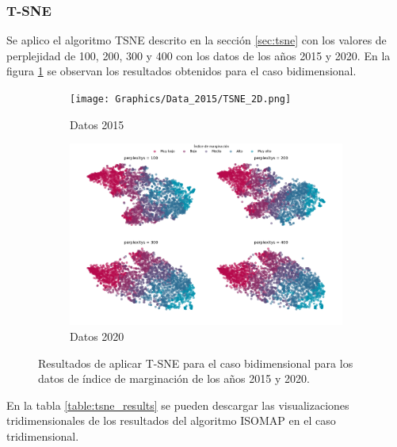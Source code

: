 \subsubsection{T-SNE}

Se aplico el algoritmo TSNE descrito en la sección \ref{sec:tsne} con los valores de perplejidad de 100, 200, 300 y 400 con los datos de los años 2015 y 2020. En la figura \ref{fig:tsne_2d} se observan los resultados obtenidos para el caso bidimensional.

\begin{figure}[H]
    \centering
    \begin{subfigure}{8.4cm}
        \texttt{[image: Graphics/Data\_2015/TSNE\_2D.png]}
        \caption{Datos 2015}
    \end{subfigure}
    \begin{subfigure}{8.4cm}
        \includegraphics[width=1\linewidth]{Graphics/Data_2020/TSNE_2D.png}
        \caption{Datos 2020}
    \end{subfigure}
    \caption{Resultados de aplicar T-SNE para el caso bidimensional para los datos de índice de marginación de los años 2015 y 2020.}
    \label{fig:tsne_2d}
\end{figure}

En la tabla \ref{table:tsne_results} se pueden descargar las visualizaciones tridimensionales de los resultados del algoritmo ISOMAP en el caso tridimensional.

